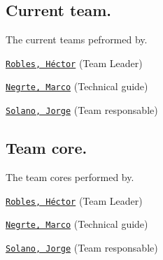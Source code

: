 \subsection*{Current team.}

The current team\textquotesingle{}s pefrormed by.


\begin{DoxyItemize}
\item \href{https://github.com/Hector290601}{\tt Robles, Héctor} (Team Leader)
\item \href{https://github.com/mnegretev}{\tt Negrte, Marco} (Technical guide)
\item \href{https://github.com/jrg-sln}{\tt Solano, Jorge} (Team responsable)
\end{DoxyItemize}

\subsection*{Team core.}

The team core\textquotesingle{}s performed by.


\begin{DoxyItemize}
\item \href{https://github.com/Hector290601}{\tt Robles, Héctor} (Team Leader)
\item \href{https://github.com/mnegretev}{\tt Negrte, Marco} (Technical guide)
\item \href{https://github.com/jrg-sln}{\tt Solano, Jorge} (Team responsable) 
\end{DoxyItemize}